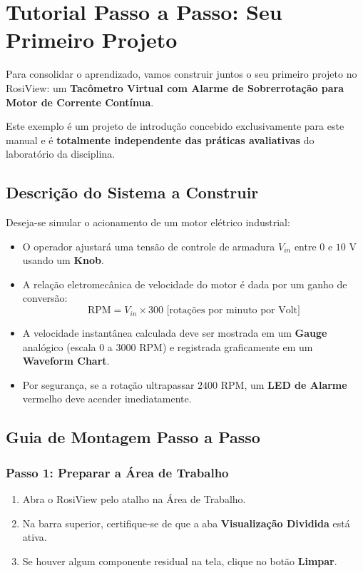 \documentclass[11pt,a4paper]{article}
\begin{document}
\section{Tutorial Passo a Passo: Seu Primeiro Projeto}

Para consolidar o aprendizado, vamos construir juntos o seu primeiro projeto no RosiView: um \textbf{Tacômetro Virtual com Alarme de Sobrerrotação para Motor de Corrente Contínua}.

\begin{atencao}
    Este exemplo é um projeto de introdução concebido exclusivamente para este manual e é \textbf{totalmente independente das práticas avaliativas} do laboratório da disciplina.
\end{atencao}

\subsection{Descrição do Sistema a Construir}
Deseja-se simular o acionamento de um motor elétrico industrial:
\begin{itemize}
    \item O operador ajustará uma tensão de controle de armadura $V_{in}$ entre $0$ e $10\text{ V}$ usando um \textbf{Knob}.
    \item A relação eletromecânica de velocidade do motor é dada por um ganho de conversão:
    \begin{equation}
        \text{RPM} = V_{in} \times 300\text{ [rotações por minuto por Volt]}
    \end{equation}
    \item A velocidade instantânea calculada deve ser mostrada em um \textbf{Gauge} analógico (escala $0$ a $3000\text{ RPM}$) e registrada graficamente em um \textbf{Waveform Chart}.
    \item Por segurança, se a rotação ultrapassar $2400\text{ RPM}$, um \textbf{LED de Alarme} vermelho deve acender imediatamente.
\end{itemize}

\subsection{Guia de Montagem Passo a Passo}

\subsubsection{Passo 1: Preparar a Área de Trabalho}
\begin{enumerate}
    \item Abra o RosiView pelo atalho na Área de Trabalho.
    \item Na barra superior, certifique-se de que a aba \textbf{Visualização Dividida} está ativa.
    \item Se houver algum componente residual na tela, clique no botão \textbf{Limpar}.
\end{enumerate}
\end{document}
